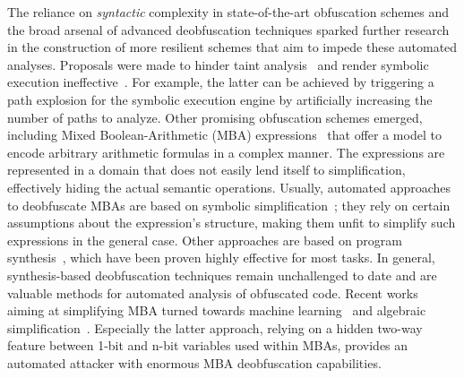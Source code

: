 \documentclass[letterpaper,twocolumn,10pt]{article}
\theoremstyle{customexample}
\theoremstyle{customexperiment}
\begin{document}
The reliance on \emph{syntactic} complexity in state-of-the-art obfuscation schemes and the broad arsenal of advanced deobfuscation techniques sparked further research in the construction of more resilient schemes that aim to impede these automated analyses.
Proposals were made to hinder taint analysis~\cite{cavallaro2007anti,sarwar2013effectiveness} and render symbolic execution ineffective~\cite{zhou2007information, banescu2016code, xu2018manufacturing, ollivier2019howto}. For example, the latter can be achieved by triggering a path explosion for the symbolic execution engine by artificially increasing the number of paths to analyze.
Other promising obfuscation schemes emerged, including Mixed Boolean-Arithmetic (MBA) expressions~\cite{zhou2007information,eyrolles2017dissertation,banescu2017predicting} that offer a model to encode arbitrary arithmetic formulas in a complex manner. The expressions are represented in a domain that does not easily lend itself to simplification, effectively hiding the actual semantic operations. Usually, automated approaches to deobfuscate MBAs are based on symbolic simplification~\cite{guinet2016arybo,barhelemy2016binary,eyrolles2016defeating,eyrolles2017dissertation}; they rely on certain assumptions about the expression's structure, making them unfit to simplify such expressions in the general case. Other approaches are based on program synthesis~\cite{blazytko2017syntia,david2020qsynth, menguy2021xyntia}, which have been proven highly effective for most tasks. In general, synthesis-based deobfuscation techniques remain unchallenged to date and are valuable methods for automated analysis of obfuscated code. Recent works aiming at simplifying MBA turned towards machine learning~\cite{feng2020neureduce} and algebraic simplification~\cite{liu2021mbablast}. Especially the latter approach, relying on a hidden two-way feature between 1-bit and n-bit variables used within MBAs, provides an automated attacker with enormous MBA deobfuscation capabilities.
\end{document}
